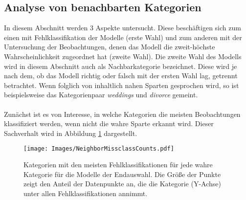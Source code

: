 \documentclass[a4paper,11pt]{article}
\begin{document}
\subsection{Analyse von benachbarten Kategorien}

In diesem Abschnitt werden $3$ Aspekte untersucht. Diese beschäftigen sich zum einen mit Fehlklassifikation der Modelle (erste Wahl) und zum anderen mit der Untersuchung der Beobachtungen, denen das Modell die zweit-höchste Wahrscheinlichkeit zugeordnet hat (zweite Wahl). Die zweite Wahl des Modells wird in diesem Abschnitt auch als Nachbarkategorie bezeichnet. Diese wird je nach dem, ob das Modell richtig oder falsch mit der ersten Wahl lag, getrennt betrachtet. Wenn folglich von inhaltlich nahen Sparten gesprochen wird, so ist beispielsweise das Kategorienpaar \textit{weddings} und \textit{divorce} gemeint.\\
\\
Zunächst ist es von Interesse, in welche Kategorien die meisten Beobachtungen klassifiziert werden, wenn nicht die wahre Sparte erkannt wird. Dieser Sachverhalt wird in Abbildung \ref{abb:NeighborMissclassCounts} dargestellt.

\begin{figure}[ht]
    \centering
\texttt{[image: Images/NeighborMissclassCounts.pdf]} 
\caption{Kategorien mit den meisten Fehlklassifikationen für jede wahre Kategorie für die Modelle der Endauswahl. Die Größe der Punkte zeigt den Anteil der Datenpunkte an, die die Kategorie (Y-Achse) unter allen Fehlklassifikationen annimmt.}
\label{abb:NeighborMissclassCounts}
\end{figure}
\end{document}
